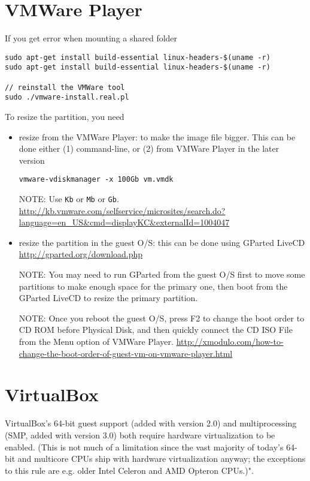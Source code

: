\section{VMWare Player}
\label{sec:VMwarePlayer}

If you get error when mounting a shared folder
\begin{verbatim}
sudo apt-get install build-essential linux-headers-$(uname -r)
sudo apt-get install build-essential linux-headers-$(uname -r)

// reinstall the VMWare tool
sudo ./vmware-install.real.pl
\end{verbatim}

To resize the partition, you need
\begin{itemize}
  \item resize from the VMWare Player: to make the image file bigger.
  This can be done either (1) command-line, or (2) from VMWare Player in the later version

\begin{verbatim}
vmware-vdiskmanager -x 100Gb vm.vmdk
\end{verbatim}  
NOTE: Use \verb!Kb! or \verb!Mb! or \verb!Gb!.
\url{http://kb.vmware.com/selfservice/microsites/search.do?language=en_US&cmd=displayKC&externalId=1004047}
  
  
  \item resize the partition in the guest O/S: this can be done using
  GParted LiveCD \url{http://gparted.org/download.php}
  
  NOTE: You may need to run GParted from the guest O/S first to move some partitions to
  make enough space for the primary one, then boot from the GParted LiveCD
  to resize the primary partition.
  
  NOTE: Once you reboot the guest O/S, press F2 to change the boot order to CD ROM
  before Physical Disk, and then quickly connect the CD ISO File
  from the Menu option of VMWare Player.
  \url{http://xmodulo.com/how-to-change-the-boot-order-of-guest-vm-on-vmware-player.html}
\end{itemize}

\section{VirtualBox} 
\label{sec:VirtualBox_howto}

VirtualBox's 64-bit guest support (added with version 2.0) and 
multiprocessing (SMP, added with version 3.0) both require hardware 
virtualization to be enabled. (This is not much of a limitation since the 
vast majority of today's 64-bit and multicore CPUs ship with hardware 
virtualization anyway; the exceptions to this rule are e.g. older Intel 
Celeron and AMD Opteron CPUs.)".


